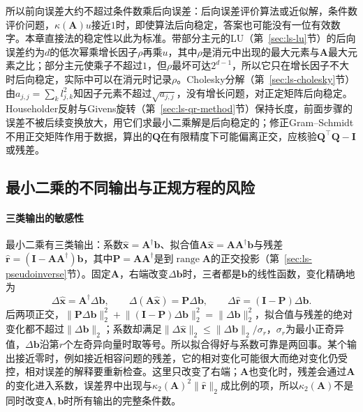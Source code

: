 所以前向误差大约不超过条件数乘后向误差：后向误差评价算法或近似解，条件数评价问题，$\kappa(\bm A)u$接近$1$时，即使算法后向稳定，答案也可能没有一位有效数字。本章直接法的稳定性以此为标准。带部分主元的LU（第~\ref{sec:ls-lu}节）的后向误差约为$d$的低次幂乘增长因子$\rho$再乘$u$，其中$\rho$是消元中出现的最大元素与$\bm A$最大元素之比；部分主元使乘子不超过$1$，但$\rho$最坏可达$2^{d-1}$，所以它只在增长因子不大时后向稳定，实际中可以在消元时记录$\rho$。Cholesky分解（第~\ref{sec:ls-cholesky}节）由$a_{j,j}=\sum_kl_{j,k}^2$知因子元素不超过$\sqrt{a_{j,j}}$，没有增长问题，对正定矩阵后向稳定。Householder反射与Givens旋转（第~\ref{sec:ls-qr-method}节）保持长度，前面步骤的误差不被后续变换放大，用它们求最小二乘解是后向稳定的；修正Gram--Schmidt不用正交矩阵作用于数据，算出的$\bm Q$在有限精度下可能偏离正交，应核验$\bm Q^\top\bm Q-\bm I$或残差。

\subsection{最小二乘的不同输出与正规方程的风险}
\label{sec:ls-ls-regularization-sensitivity}

\paragraph{三类输出的敏感性}
最小二乘有三类输出：系数$\hat{\bm x}=\bm A^\dagger\bm b$、拟合值$\bm A\hat{\bm x}=\bm A\bm A^\dagger\bm b$与残差$\hat{\bm r}=(\bm I-\bm A\bm A^\dagger)\bm b$，其中$\bm P=\bm A\bm A^\dagger$是到$\operatorname{range}\bm A$的正交投影（第~\ref{sec:ls-pseudoinverse}节）。固定$\bm A$，右端改变$\Delta\bm b$时，三者都是$\bm b$的线性函数，变化精确地为
\[
 \Delta\hat{\bm x}=\bm A^\dagger\Delta\bm b,\qquad
 \Delta(\bm A\hat{\bm x})=\bm P\Delta\bm b,\qquad
 \Delta\hat{\bm r}=(\bm I-\bm P)\Delta\bm b .
\]
后两项正交，$\lVert\bm P\Delta\bm b\rVert_2^2+\lVert(\bm I-\bm P)\Delta\bm b\rVert_2^2=\lVert\Delta\bm b\rVert_2^2$，拟合值与残差的绝对变化都不超过$\lVert\Delta\bm b\rVert_2$；系数却满足$\lVert\Delta\hat{\bm x}\rVert_2\leq\lVert\Delta\bm b\rVert_2/\sigma_r$，$\sigma_r$为最小正奇异值，$\Delta\bm b$沿第$r$个左奇异向量时取等号。所以拟合得好与系数可靠是两回事。某个输出接近零时，例如接近相容问题的残差，它的相对变化可能很大而绝对变化仍受控，相对误差的解释要重新检查。这里只改变了右端；$\bm A$也变化时，残差会通过$\bm A$的变化进入系数，误差界中出现与$\kappa_2(\bm A)^2\lVert\hat{\bm r}\rVert_2$成比例的项，所以$\kappa_2(\bm A)$不是同时改变$\bm A,\bm b$时所有输出的完整条件数。


